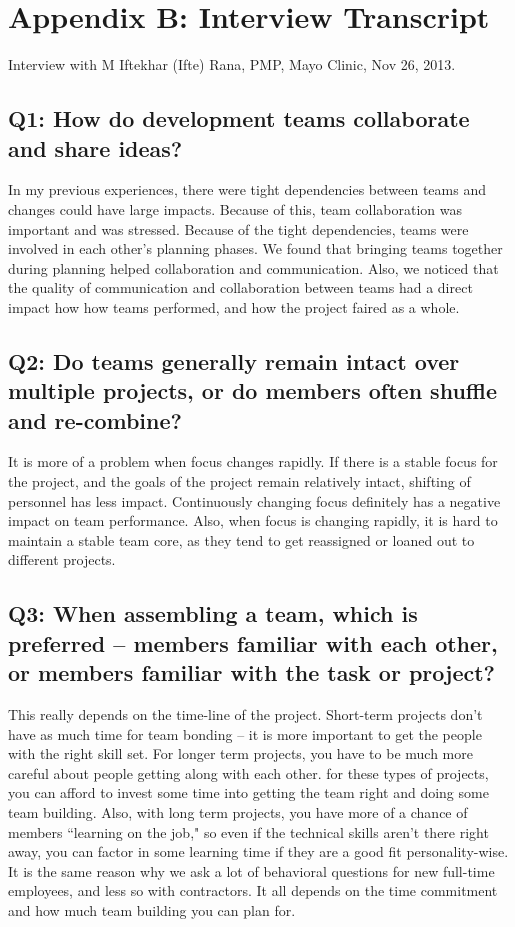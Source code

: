 \clearpage

\section*{Appendix B: Interview Transcript}
Interview with M Iftekhar (Ifte) Rana, PMP\textregistered, Mayo Clinic, Nov 26, 2013.

\subsection*{Q1: How do development teams collaborate and share ideas?}
In my previous experiences, there were tight dependencies between teams and changes could have large impacts. Because of this, team collaboration was important and was stressed. Because of the tight dependencies, teams were involved in each other's planning phases. We found that bringing teams together during planning helped collaboration and communication. Also, we noticed that the quality of communication and collaboration between teams had a direct impact how how teams performed, and how the project faired as a whole.


\subsection*{Q2: Do teams generally remain intact over multiple projects, or do members often shuffle and re-combine?}
It is more of a problem when focus changes rapidly. If there is a stable focus for the project, and the goals of the project remain relatively intact, shifting of personnel has less impact. Continuously changing focus definitely has a negative impact on team performance. Also, when focus is changing rapidly, it is hard to maintain a stable team core, as they tend to get reassigned or loaned out to different projects.


\subsection*{Q3: When assembling a team, which is preferred -- members familiar with each other, or members familiar with the task or project?}
This really depends on the time-line of the project. Short-term projects don't have as much time for team bonding -- it is more important to get the people with the right skill set. For longer term projects, you have to be much more careful about people getting along with each other. for these types of projects, you can afford to invest some time into getting the team right and doing some team building. Also, with long term projects, you have more of a chance of members ``learning on the job," so even if the technical skills aren't there right away, you can factor in some learning time if they are a good fit personality-wise. It is the same reason why we ask a lot of behavioral questions for new full-time employees, and less so with contractors. It all depends on the time commitment and how much team building you can plan for.


